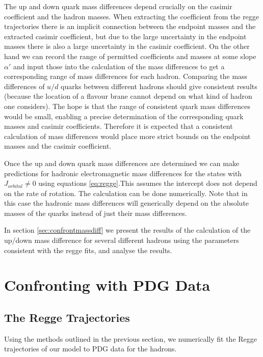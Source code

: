\documentclass[11pt,a4paper]{article}
\begin{document}
The up and down quark mass differences depend crucially on the casimir coefficient and the hadron masses. When extracting the coefficient from the regge trajectories there is an implicit connection between the endpoint masses and the extracted casimir coefficient, but due to the large uncertainty in the endpoint masses there is also a large uncertainty in the casimir coefficient. On the other hand we can record the range of permitted coefficients and masses at some slope $\alpha'$ and input those into the calculation of the mass differences to get a corresponding range of mass differences for each hadron. Comparing the mass differences of $u/d$ quarks between different hadrons should give consistent results (because the location of a flavour brane cannot depend on what kind of hadron one considers). The hope is that the range of consistent quark mass differences would be small, enabling a precise determination of the corresponding quark masses and casimir coefficients. Therefore it is expected that a consistent calculation of mass differences would place more strict bounds on the endpoint masses and the casimir coefficient.

Once the up and down quark mass differences are determined we can make predictions for hadronic electromagnetic mass differences for the states with $J_{orbital}\neq 0$ using equations \ref{eq:regge}.This assumes the intercept does not depend on the rate of rotation. The calculation can be done numerically. Note that in this case the hadronic mass differences will generically depend on the absolute masses of the quarks instead of just their mass differences.

In section \ref{sec:confrontmassdiff} we present the results of the calculation of the up/down mass difference for several different hadrons using the parameters consistent with the regge fits, and analyse the results.

\FloatBarrier
\section{Confronting with PDG Data}

\subsection{The Regge Trajectories}
\label{sec:reggefit}

Using the methods outlined in the previous section, we numerically fit the Regge trajectories of our model to PDG data for the hadrons.
\end{document}
